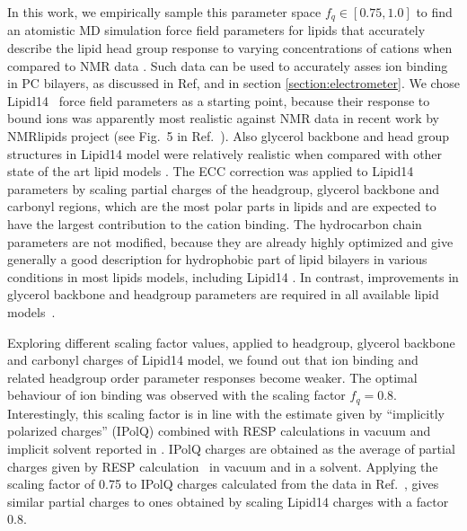 \documentclass[aip,jcp,twocolumn]{revtex4}
\begin{document}
In this work, we empirically sample this parameter space $f_q \in [0.75, 1.0]$
to find an atomistic MD simulation force field parameters for lipids that
accurately describe the lipid head group response to varying concentrations of cations
when compared to NMR data \cite{akutsu81,altenbach84,scherer89}. Such data can be used to accurately asses
ion binding in PC bilayers, as discussed in Ref,  and in section \ref{section:electrometer}.
We chose Lipid14~\cite{dickson14} force field parameters as a starting point,
because their response to bound ions was apparently most realistic against NMR data
in recent work by NMRlipids project (see Fig.~5 in Ref.~).
Also glycerol backbone and head group structures in Lipid14 model were
relatively realistic when compared with other state of the art lipid models \cite{botan15}.
The ECC correction was applied to Lipid14 parameters by scaling partial charges of the headgroup,
glycerol backbone and carbonyl regions, which are the most polar parts in lipids and
are expected to have the largest contribution to the cation binding.
The hydrocarbon chain parameters are not modified, because they are
already highly optimized and give generally a good description for
hydrophobic part of lipid bilayers in various conditions
in most lipids models, including Lipid14 \cite{ollila16}.
In contrast, improvements in glycerol backbone and headgroup
parameters are required in all available lipid models~\cite{botan15}. 

Exploring different scaling factor values, applied to headgroup, glycerol backbone
and carbonyl charges of Lipid14 model, we found out that ion binding and
related headgroup order parameter responses become weaker. 
The optimal behaviour of ion binding was observed with
the scaling factor $f_q = 0.8$. %
Interestingly, this scaling factor is in line with the estimate
given by ``implicitly polarized charges'' (IPolQ) \cite{ipolq2013}
combined with RESP calculations in vacuum and implicit solvent reported
in \cite{maciejewski14}. IPolQ charges are obtained as the average of
partial charges given by RESP calculation~\cite{RESP_paper}
in vacuum and in a solvent. Applying the scaling factor of 0.75 to
IPolQ charges calculated from the data in Ref.~\cite{maciejewski14},
gives similar partial charges to ones obtained by scaling Lipid14 charges
with a factor 0.8.
\end{document}
